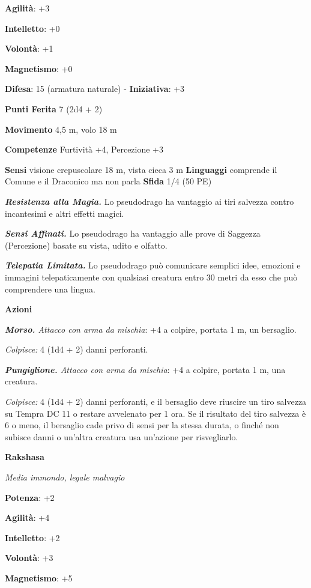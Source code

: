 \begin{multicols}{2}
\textbf{Agilità}: +3

\textbf{Intelletto}: +0

\textbf{Volontà}: +1

\textbf{Magnetismo}: +0

\textbf{Difesa}: 15 (armatura naturale) - \textbf{Iniziativa}: +3

\textbf{Punti Ferita} 7 (2d4 + 2)

\textbf{Movimento} 4,5 m, volo 18 m

\textbf{Competenze} Furtività +4, Percezione +3

\textbf{Sensi} visione crepuscolare 18 m, vista cieca 3 m
\textbf{Linguaggi} comprende il Comune e il Draconico ma non parla
\textbf{Sfida} 1/4 (50 PE)\smallskip

\emph{\textbf{Resistenza alla Magia.}} Lo pseudodrago ha vantaggio ai
tiri salvezza contro incantesimi e altri effetti magici.

\emph{\textbf{Sensi Affinati.}} Lo pseudodrago ha vantaggio alle prove
di Saggezza (Percezione) basate su vista, udito e olfatto.

\emph{\textbf{Telepatia Limitata.}} Lo pseudodrago può comunicare
semplici idee, emozioni e immagini telepaticamente con qualsiasi
creatura entro 30 metri da esso che può comprendere una lingua.

\smallskip\textbf{Azioni}

\emph{\textbf{Morso.} Attacco con arma da mischia}: +4 a colpire,
portata 1 m, un bersaglio.

\emph{Colpisce:} 4 (1d4 + 2) danni perforanti.

\emph{\textbf{Pungiglione.} Attacco con arma da mischia}: +4 a colpire,
portata 1 m, una creatura.

\emph{Colpisce:} 4 (1d4 + 2) danni perforanti, e il bersaglio deve
riuscire un tiro salvezza su Tempra DC 11 o restare avvelenato per
1 ora. Se il risultato del tiro salvezza è 6 o meno, il bersaglio cade
privo di sensi per la stessa durata, o finché non subisce danni o
un'altra creatura usa un'azione per risvegliarlo.


\textbf{Rakshasa}

\emph{Media immondo, legale malvagio}

\textbf{Potenza}: +2

\textbf{Agilità}: +4

\textbf{Intelletto}: +2

\textbf{Volontà}: +3

\textbf{Magnetismo}: +5


\end{multicols}
